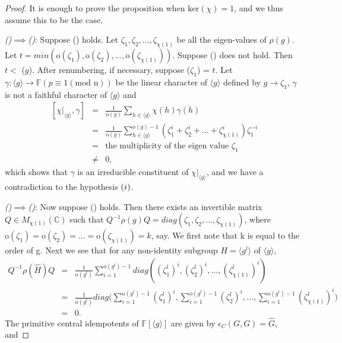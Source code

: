 \documentclass[12pt, reqno]{amsart}
\numberwithin{equation}{section}
\theoremstyle{definition}
\theoremstyle{remark}
\theoremstyle{plain}
\begin{document}
 \begin{proof}
 It is enough to prove the proposition when $\text{ker}(\chi)=1$, and we thus assume this to be the case.\smallskip
 
 {\it()}$\implies${\it()}: Suppose () holds. Let $\zeta_1, \zeta_2,..., \zeta_{\chi(1)}$ be all the eigen-values of $\rho(g)$. Let $t= min(\text{o}(\zeta_1), \text{o}(\zeta_2),...,\text{o}(\zeta_{\chi(1)}))$. Suppose () does not hold. Then $t<$ ($g$). After renumbering, if necessary, suppose ($\zeta_1$) = $t$. Let $\gamma: \langle g \rangle \rightarrow \mathbb{F}(p\equiv 1(\text{mod n}))$ be the linear character of $\langle g \rangle$ defined by $g\rightarrow\zeta_1$, $\gamma$ is not a faithful character of $\langle g \rangle$ and
 \begin{eqnarray}\nonumber
   [\chi|_{\langle g \rangle},\gamma] &=&  \frac{1}{\text{o}(g)}\sum_{h\in {\langle g \rangle}}\chi(h)\overline{\gamma(h)} \\\nonumber
    &=& \frac{1}{\text{o}(g)}\sum_{h\in {\langle g \rangle}}^{\text{o}(g)-1}(\zeta^i_1+\zeta^i_2+...+\zeta^i_{\chi(1)})\zeta^{-i}_1  \\\nonumber
    &=& \text{the multiplicity of the eigen value $\zeta_1$}\\\nonumber
    &\neq& 0,\nonumber
 \end{eqnarray}
 which shows that $\gamma$ is an irreducible constituent of $\chi|_{\langle g \rangle}$, and we have a contradiction to the hypothesis $(\romannumeral1)$.\smallskip
  
 {\it()}$\implies${\it()}: Now suppose () holds. Then there exists an invertible matrix  $Q\in M_{\chi(1)}(\mathbb{C})$ such that $Q^{-1}\rho(g)Q = diag(\zeta_1, \zeta_2,...,\zeta_{\chi(1)})$, where $\text{o}(\zeta_1) = \text{o}(\zeta_2) = ...= \text{o}(\zeta_{\chi(1)}) = k$, say. We first note that k is equal to the order of g. Next we see that for any non-identity subgroup $H = \langle g^l\rangle$ of $\langle g \rangle$,\\
 \begin{eqnarray}\nonumber
   Q^{-1}\rho(\hat{H})Q &=& \frac{1}{\text{o}(g^l)}\sum_{i=1}^{\text{o}(g^l)-1}diag((\zeta^l_1)^i, (\zeta^l_2)^i, ..., (\zeta^l_{\chi(1)})^i)   \\\nonumber
   &=&\frac{1}{\text{o}(g^l)}diag\bigg(\sum_{i=1}^{\text{o}(g^l)-1}(\zeta^l_1)^i, \sum_{i=1}^{\text{o}(g^l)-1}(\zeta^l_2)^i, ..., \sum_{i=1}^{\text{o}(g^l)-1} (\zeta^l_{\chi(1)})^i\bigg) \\\nonumber
    &=& 0.\nonumber
 \end{eqnarray}
 The primitive central idempotents of $\mathbb{F}[\langle g \rangle]$ are given by $\epsilon_C(G,G)=\hat{G}$, and\smallskip
 

\end{proof}
\end{document}
